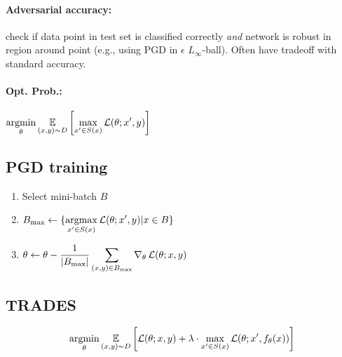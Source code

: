\paragraph{Adversarial accuracy:} check if data point in test set is classified correctly \emph{and} network is robust in region around point (e.g., using PGD in $\epsilon$ $L_\infty$-ball). Often have tradeoff with standard accuracy. 
\paragraph{Opt. Prob.:} $\displaystyle \operatorname*{argmin}_\theta \operatorname*{\mathbb{E}}_{(x, y) \sim D} \left[ \max_{x' \in S(x)} \operatorname{\mathcal{L}}(\theta; x', y)\right]$
\subsection*{PGD training}
\begin{enumerate}
    \item Select mini-batch $B$
    \item $\displaystyle B_\text{max} \gets \{\operatorname*{argmax}_{x' \in S(x)} \operatorname{\mathcal{L}}(\theta; x', y) \lvert x \in B\}$
    \item $\displaystyle \theta \gets \theta - \frac{1}{\lvert B_\text{max} \rvert} \sum_{(x, y) \in B_\text{max}} \nabla_\theta \operatorname{\mathcal{L}}(\theta; x, y)$
\end{enumerate}
\subsection*{TRADES}
$$ \operatorname*{argmin}_\theta \operatorname*{\mathbb{E}}_{(x, y) \sim D} \left[ \operatorname{\mathcal{L}}(\theta; x, y) + \lambda \cdot \max_{x' \in S(x)} \operatorname{\mathcal{L}}(\theta; x', f_\theta(x))\right]$$